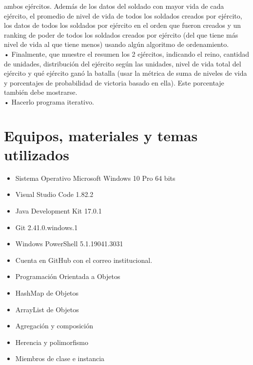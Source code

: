 \documentclass{article}
\begin{document}
\begin{itemize}
	      ambos ejércitos. Además de los datos del soldado con mayor vida de cada
	      ejército, el promedio de nivel de vida de todos los soldados creados por ejército,
	      los datos de todos los soldados por ejército en el orden que fueron creados y
	      un ranking de poder de todos los soldados creados por ejército (del que tiene
	      más nivel de vida al que tiene menos) usando algún algoritmo de ordenamiento.
	      \\• Finalmente, que muestre el resumen los 2 ejércitos, indicando el reino, cantidad
	      de unidades, distribución del ejército según las unidades, nivel de vida total del
	      ejército y qué ejército ganó la batalla (usar la métrica de suma de niveles de
	      vida y porcentajes de probabilidad de victoria basado en ella). Este porcentaje
	      también debe mostrarse.
	      \\• Hacerlo programa iterativo.
\end{itemize}
\pagebreak

\section{Equipos, materiales y temas utilizados}
\begin{itemize}
	\item Sistema Operativo Microsoft Windows 10 Pro 64 bits
	\item Visual Studio Code 1.82.2
	\item Java Development Kit 17.0.1
	\item Git 2.41.0.windows.1
	\item Windows PowerShell 5.1.19041.3031
	\item Cuenta en GitHub con el correo institucional.
	\item Programación Orientada a Objetos
	\item HashMap de Objetos
	\item ArrayList de Objetos
	\item Agregación y composición
	\item Herencia y polimorfismo
	\item Miembros de clase e instancia
\end{itemize}
\end{document}
